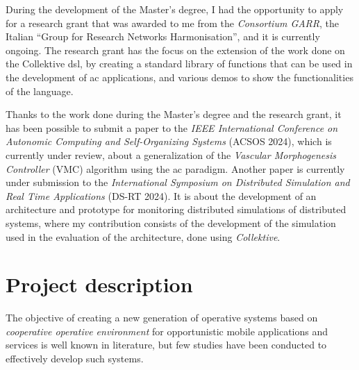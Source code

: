 \documentclass[12pt, a4paper]{article}
\begin{document}
During the development of the Master's degree,
I had the opportunity to apply for a research grant that was awarded to me from the \emph{Consortium GARR},
the Italian ``Group for Research Networks Harmonisation'',
and it is currently ongoing.
%
The research grant has the focus on the extension of the work done on the Collektive \ac{dsl},
by creating a standard library of functions that can be used in the development of \ac{ac} applications,
and various demos to show the functionalities of the language.

Thanks to the work done during the Master's degree and the research grant,
it has been possible to submit a paper to the \emph{IEEE International Conference on Autonomic Computing and Self-Organizing Systems} (ACSOS 2024),
which is currently under review,
about a generalization of the \emph{Vascular Morphogenesis Controller} (VMC) algorithm using the \ac{ac} paradigm.
%
Another paper is currently under submission to the \emph{International Symposium on Distributed Simulation and Real Time Applications} (DS-RT 2024).
%
It is about the development of an architecture and prototype for monitoring distributed simulations of distributed systems,
where my contribution consists of the development of the simulation used in the evaluation of the architecture,
done using \emph{Collektive}.


\section{Project description}\label{sec:project-description}
The objective of creating a new generation of operative systems based on \emph{cooperative operative environment}
for opportunistic mobile applications and services is well known in literature,
but few studies have been conducted to effectively develop such systems.
\end{document}
